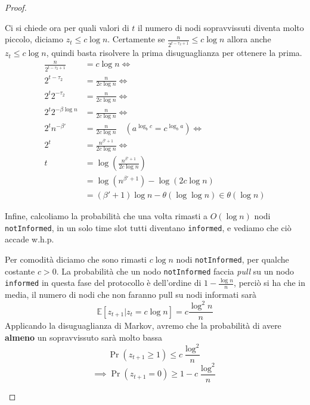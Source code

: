 \begin{teorema}
\begin{proof}
\begin{description}
            Ci si chiede ora per quali valori di $t$ il numero di nodi sopravvissuti diventa molto piccolo, diciamo $z_t \leq c \log n$. Certamente se $\frac{n}{2^{t - \tau_2 + 1}} \leq c\log n$ allora anche $z_t \leq c \log n$, quindi basta risolvere la prima disuguaglianza per ottenere la prima.
            \begin{align*}
                \frac{n}{2^{t - \tau_2 + 1}} &= c\log n \iff \\
                2^{t - \tau_2} &= \frac{n}{2c\log n} \iff \\
                2^t2^{-\tau_2} &= \frac{n}{2c\log n} \iff \\
                2^t2^{-\beta \log n} &= \frac{n}{2c\log n} \iff \\
                2^tn^{-\beta'} &= \frac{n}{2c\log n} \quad (a^{\log_b c} = c^{\log_b a}) \iff \\
                2^t &= \frac{n^{\beta' + 1}}{2c\log n} \iff \\
                t &= \log \left( \frac{n^{\beta' + 1}}{2c \log n} \right) \\
                &= \log\left(n^{\beta' + 1}\right) - \log (2c\log n) \\
                &= (\beta' + 1)\log n - \theta(\log \log n) \in \theta(\log n)
            \end{align*}
        \item[Final Step] Infine, calcoliamo la probabilità che una volta rimasti a $O(\log n)$ nodi \texttt{notInformed}, in un solo time slot tutti diventano \texttt{informed}, e vediamo che ciò accade w.h.p.
        
        Per comodità diciamo che sono rimasti $c \log n$ nodi \texttt{notInformed}, per qualche costante $c > 0$. La probabilità che un nodo \texttt{notInformed} faccia \textit{pull} su un nodo \texttt{informed} in questa fase del protocollo è dell'ordine di $1 - \frac{\log n}{n}$, perciò si ha che in media, il numero di nodi che non faranno pull su nodi informati sarà
        \[
            \mathbb{E}[z_{t + 1} | z_t = c\log n] = c \frac{\log^2 n}{n}
        \]
        Applicando la disuguaglianza di Markov, avremo che la probabilità di avere \textbf{almeno} un sopravvissuto sarà molto bassa
        \[
            \Pr(z_{t+1} \geq 1) \leq c \frac{\log^2}{n}
        \]
        \[
            \implies \Pr(z_{t+1} = 0) \geq 1- c \frac{\log^2}{n}
        \]
        \end{description}

    \end{proof}
\end{teorema}

